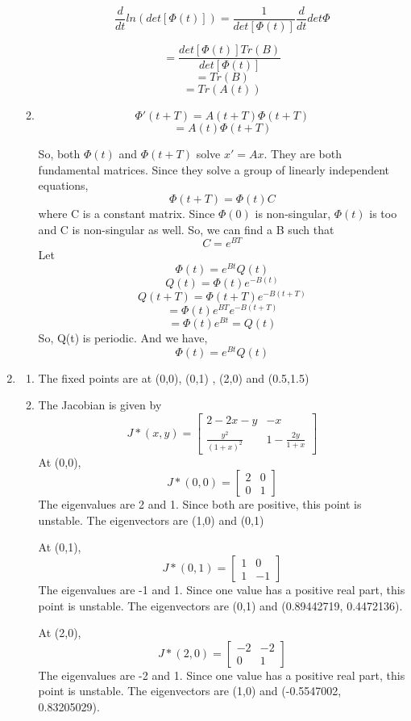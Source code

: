 \documentclass[a4paper]{article}
\begin{document}
\begin{enumerate}
\begin{enumerate}
	\[  \frac{d}{dt} ln( det[\Phi(t)]) = \frac{1}{det[\Phi(t)]} \frac{d}{dt} det\Phi  \]	
	
	\[  = \frac{det[\Phi(t)] Tr(B)}{det[\Phi(t)]}   \]		
	\[  = Tr(B)  \]	
		\[  = Tr(A(t))  \]	
		
\item
\[\Phi'(t+T)= A(t+T)\Phi(t+T)  \]	
\[= A(t)\Phi(t+T)  \]	

So, both $\Phi(t)$ and $\Phi(t +T)$ solve $ x'= Ax $. They are both fundamental matrices. Since they solve a group of linearly independent equations,
\[\Phi(t+T)= \Phi(t)C  \]
 where C is a constant matrix.
 Since $\Phi(0)$ is non-singular, $\Phi(t)$ is too and C is non-singular as well. So, we can find a B such that
 \[C= e^{BT}\]
 Let 
 \[\Phi(t)= e^{Bt} Q(t)\]
 \[ Q(t)= \Phi(t)e^{-B(t)}\]	
  \[ Q(t+T)= \Phi(t+T)e^{-B(t+T)}\]	
    \[ = \Phi(t)e^{BT}e^{-B(t+T)}\]	
        \[ = \Phi(t)e^{Bt} = Q(t)\]
So, Q(t) is periodic. And we have,
 \[\Phi(t)= e^{Bt}Q(t) \]	
\end{enumerate}

\item
\begin{enumerate}
	\item
	 The fixed points are at (0,0), (0,1) , (2,0) and (0.5,1.5)
	 \item The Jacobian is given by
	 \[J*(x,y)= \begin{bmatrix}
	 2-2x-y &-x\\ \frac{y^2}{(1+x)^2} &1-\frac{2y}{1+x}
	 \end{bmatrix}\]
	 At (0,0), 
	 \[J*(0,0)= \begin{bmatrix}
	 2 &0\\ 0 &1
	 \end{bmatrix}\]
	 The eigenvalues are 2 and 1. Since both are positive, this point is unstable.
	 The eigenvectors are (1,0) and (0,1)
	 
	 At (0,1), 
	 \[J*(0,1)= \begin{bmatrix}
	 1 &0\\ 1 &-1
	 \end{bmatrix}\]
	 The eigenvalues are -1 and 1. Since one value has a positive real part, this point is unstable.
	 The eigenvectors are (0,1) and (0.89442719, 0.4472136).	 	 
	
	 At (2,0), 
	 \[J*(2,0)= \begin{bmatrix}
	 -2 &-2\\ 0 &1
	 \end{bmatrix}\]
	 The eigenvalues are -2 and 1. Since one value has a positive real part, this point is unstable.
	 The eigenvectors are (1,0) and (-0.5547002, 0.83205029).
	 

\end{enumerate}
\end{enumerate}
\end{document}
